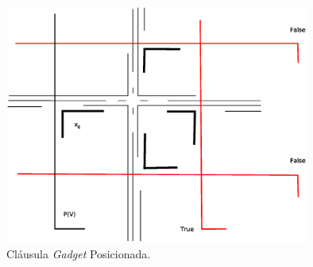 \begin{figure}[htb]	
\center%
\includegraphics[width=10cm]{./img/clausulaGadgetGF.eps}
\caption{Cláusula \textit{Gadget} Posicionada.}
\label{fig:clausulagadgetgf}
\end{figure}